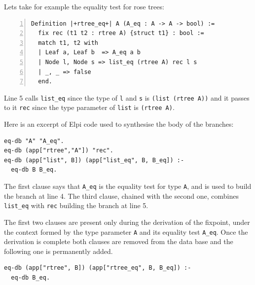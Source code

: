 \documentclass[sigplan,10pt,review]{acmart}\settopmatter{printfolios=true,printccs=false,printacmref=false}
\begin{document}
Lets take for example the equality test for rose trees:

\begin{minipage}{\textwidth}\begin{lstlisting}[numbers=left]
Definition |+rtree_eq+| A (A_eq : A -> A -> bool) :=
  fix rec (t1 t2 : rtree A) {struct t1} : bool :=
  match t1, t2 with
  | Leaf a, Leaf b  => A_eq a b
  | Node l, Node s => list_eq (rtree A) rec l s
  | _, _ => false
  end.
\end{lstlisting}\end{minipage}

\noindent
Line 5 calls \lstinline+list_eq+ since the type of \lstinline+l+ and
\lstinline+s+ is \lstinline+(list (rtree A))+ and it passes to it
\lstinline+rec+ since the type parameter of \lstinline+list+ is
\lstinline+(rtree A)+.

Here is an excerpt of Elpi code used to synthesise the body of the
branches:

\begin{minipage}{\textwidth}\begin{lstlisting}
eq-db "A" "A_eq".
eq-db (app["rtree","A"]) "rec".
eq-db (app["list", B]) (app["list_eq", B, B_eq]) :-
  eq-db B B_eq.
\end{lstlisting}\end{minipage}

\noindent
The first clause says that \lstinline+A_eq+ is the equality test for type
\lstinline+A+, and is used to build the branch at line 4.
The third clause, chained with the second one, combines
\lstinline+list_eq+ with \lstinline+rec+ building the branch at line
5.

The first two clauses are present only during the
derivation of the fixpoint, under the context formed by
the type parameter \lstinline+A+ and its equality test
\lstinline+A_eq+. 
Once the derivation is complete both clauses are removed 
from the data base and the
following one is permanently added.

\begin{minipage}{\textwidth}\begin{lstlisting}[]
eq-db (app["rtree", B]) (app["rtree_eq", B, B_eq]) :-
  eq-db B_eq.
\end{lstlisting}\end{minipage}


% 
% 
\end{document}
